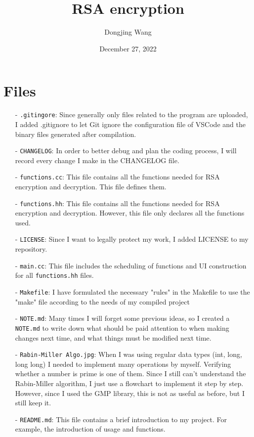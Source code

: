 \documentclass{article}
\title{RSA encryption}
\author{Dongjing Wang}
\date{December 27, 2022}
\begin{document}
\maketitle

\section{Files}
    \begin{enumerate}
        \item[-] \texttt{.gitingore}: Since generally only files related to the program are uploaded, I added .gitignore to let Git ignore the configuration file of VSCode and the binary files generated after compilation.
        \item[-] \texttt{CHANGELOG}: In order to better debug and plan the coding process, I will record every change I make in the CHANGELOG file.
        \item[-] \texttt{functions.cc}: This file contains all the functions needed for RSA encryption and decryption. This file defines them.
        \item[-] \texttt{functions.hh}: This file contains all the functions needed for RSA encryption and decryption. However, this file only declares all the functions used.
        \item[-] \texttt{LICENSE}: Since I want to legally protect my work, I added LICENSE to my repository.
        \item[-] \texttt{main.cc}: This file includes the scheduling of functions and UI construction for all \texttt{functions.hh} files.
        \item[-] \texttt{Makefile}: I have formulated the necessary "rules" in the Makefile to use the "make" file according to the needs of my compiled project
        \item[-] \texttt{NOTE.md}: Many times I will forget some previous ideas, so I created a \texttt{NOTE.md} to write down what should be paid attention to when making changes next time, and what things must be modified next time.
        \item[-] \texttt{Rabin-Miller Algo.jpg}: When I was using regular data types (int, long, long long) I needed to implement many operations by myself. Verifying whether a number is prime is one of them. Since I still can't understand the Rabin-Miller algorithm, I just use a flowchart to implement it step by step. However, since I used the GMP library, this is not as useful as before, but I still keep it.
        \item[-] \texttt{README.md}: This file contains a brief introduction to my project. For example, the introduction of usage and functions.
    \end{enumerate}
\end{document}
